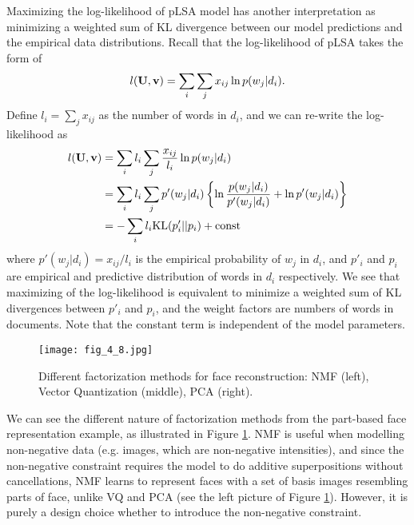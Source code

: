 \documentclass[../book-template.tex]{subfiles}
\begin{document}
\begin{remark}
	Maximizing the log-likelihood of pLSA model has another interpretation as minimizing a weighted sum of KL divergence between our model predictions and the empirical data distributions. Recall that the log-likelihood of pLSA takes the form of
	\begin{equation*}
		l({\bf U,v})=\sum_{i}\sum_{j}x_{ij} \ln p(w_j|d_i).
	\end{equation*}
	Define $l_i=\sum_j x_{ij}$ as the number of words in $d_i$, and we can re-write the log-likelihood as
	\begin{align*}
		l({\bf U,v})&=\sum_{i}l_i\sum_{j}\frac{x_{ij}}{l_i}\ln p(w_j|d_i)\\
		&= \sum_{i}l_i\sum_{j} p'(w_j|d_i)\left\{\ln \frac{p(w_j|d_i)}{p'(w_j|d_i)} +\ln p'(w_j|d_i)\right\}\\
		&= -\sum_{i}l_i {\rm KL}(p'_{i}||p_i) + {\rm const}
	\end{align*}
	where $p'(w_j|d_i) = x_{ij}/l_i$ is the empirical probability of $w_j$ in $d_i$, and $p'_i$ and $p_i$ are empirical and predictive distribution of words in $d_i$ respectively. We see that maximizing of the log-likelihood is equivalent to minimize a weighted sum of KL divergences between $p'_i$ and $p_i$, and the weight factors are numbers of words in documents. Note that the constant term is independent of the model parameters.
\end{remark}
\begin{figure}[h] 
	\centering 
	\texttt{[image: fig\_4\_8.jpg]} 
	\caption{Different factorization methods for face reconstruction: NMF (left), Vector Quantization (middle), PCA (right).}\label{fig_4_8}
\end{figure}
\par We can see the different nature of factorization methods from the part-based face representation example, as illustrated in Figure \ref{fig_4_8}. NMF is useful when modelling non-negative data (e.g. images, which are non-negative intensities), and since the non-negative constraint requires the model to do additive superpositions without cancellations, NMF learns to represent faces with a set of basis images resembling parts of face, unlike VQ and PCA (see the left picture of Figure \ref{fig_4_8}). However, it is purely a design choice whether to introduce the non-negative constraint.
\end{document}
